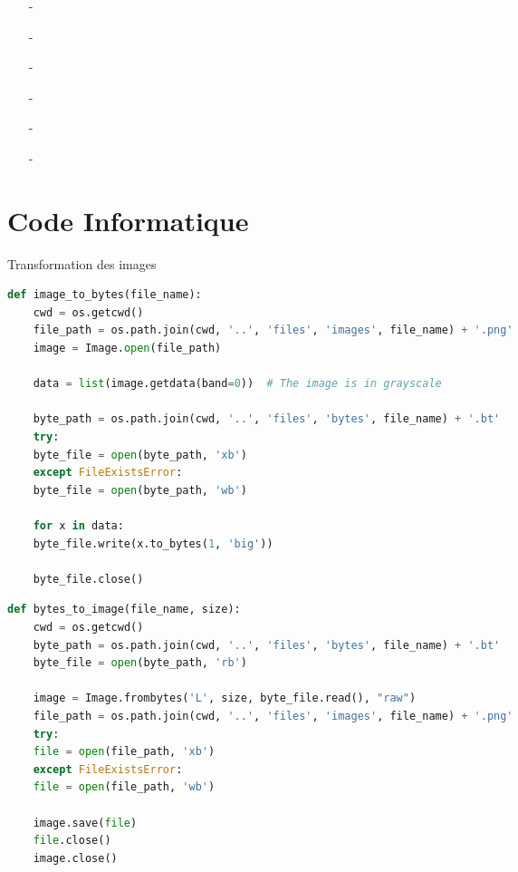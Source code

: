 \documentclass[11pt]{beamer}
\begin{document}
\begin{frame}[plain]
	\footnotesize
	\begin{itemize}
		\item[-] \cite{voyager}
		\item[-] \cite{shannon}
		\item[-] \cite{gallager}
		\item[-] \cite{turbocodes}
		\item[-] \cite{ccsds}
		\item[-] \cite{juno}
	\end{itemize}
\end{frame}


\section{Code Informatique}


\begin{frame}{Transformation des images}
	\begin{lstlisting}[language=Python]
def image_to_bytes(file_name):
	cwd = os.getcwd()
	file_path = os.path.join(cwd, '..', 'files', 'images', file_name) + '.png'
	image = Image.open(file_path)
	
	data = list(image.getdata(band=0))  # The image is in grayscale
	
	byte_path = os.path.join(cwd, '..', 'files', 'bytes', file_name) + '.bt'
	try:
	byte_file = open(byte_path, 'xb')
	except FileExistsError:
	byte_file = open(byte_path, 'wb')
	
	for x in data:
	byte_file.write(x.to_bytes(1, 'big'))
	
	byte_file.close()
	\end{lstlisting}
\end{frame}

\begin{frame}
	\begin{lstlisting}[language=Python]
def bytes_to_image(file_name, size):
	cwd = os.getcwd()
	byte_path = os.path.join(cwd, '..', 'files', 'bytes', file_name) + '.bt'
	byte_file = open(byte_path, 'rb')
	
	image = Image.frombytes('L', size, byte_file.read(), "raw")
	file_path = os.path.join(cwd, '..', 'files', 'images', file_name) + '.png'
	try:
	file = open(file_path, 'xb')
	except FileExistsError:
	file = open(file_path, 'wb')
	
	image.save(file)
	file.close()
	image.close()	
	\end{lstlisting}
\end{frame}
\end{document}
